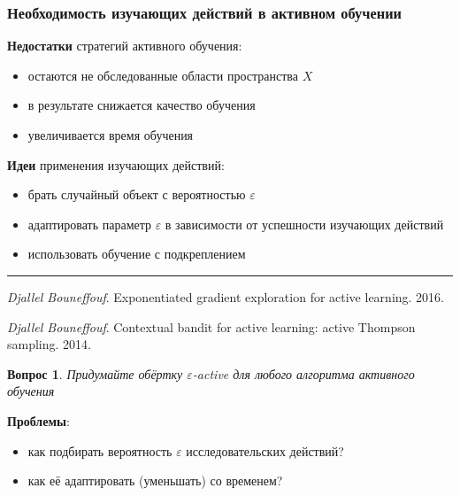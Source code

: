 \documentclass[fullscreen=true, bookmarks=true, hyperref={pdfencoding=unicode}]{beamer}
\newtheorem*{question}{Вопрос}
\begin{document}
\begin{frame}
  \frametitle{Необходимость изучающих действий в активном обучении}

  {\bf Недостатки} стратегий активного обучения:
  \begin{itemize}
    \item остаются не обследованные области пространства $X$
    \item в результате снижается качество обучения
    \item увеличивается время обучения
  \end{itemize}

  \vspace{0.5cm}
  {\bf Идеи} применения изучающих действий:
  \begin{itemize}
    \item брать случайный объект с вероятностью $\varepsilon$
    \item адаптировать параметр $\varepsilon$ в зависимости от успешности изучающих действий
    \item использовать обучение с подкреплением
  \end{itemize}

  \noindent\rule{8cm}{0.4pt}

  {\small
  {\it Djallel Bouneffouf}. Exponentiated gradient exploration for active learning. 2016.

  {\it Djallel Bouneffouf}. Contextual bandit for active learning: active Thompson sampling. 2014.
  }

\end{frame}


\begin{frame}
  \begin{question}
    Придумайте обёртку $\varepsilon$-active для любого алгоритма активного обучения
  \end{question}

  \vspace{1cm}
  \pause
  {\bf Проблемы}:
  \begin{itemize}
    \item как подбирать вероятность $\varepsilon$ исследовательских действий?
    \item как её адаптировать (уменьшать) со временем?
  \end{itemize}

\end{frame}
\end{document}
